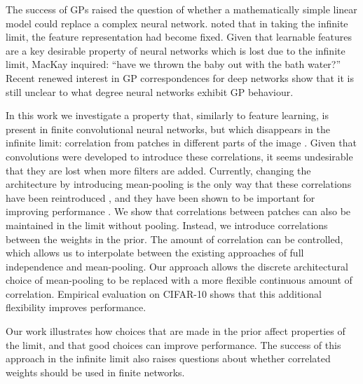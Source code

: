 \documentclass{article}
\theoremstyle{definition}
\begin{document}
The success of GPs raised the question of whether a mathematically simple linear model could replace a complex neural network. \citet{mackay1998introgp} noted that in taking the infinite limit, the feature representation had become fixed. Given that learnable features are a key desirable property of neural networks which is lost due to the infinite limit, MacKay inquired: ``have we thrown the baby out with the bath water?'' Recent renewed interest in GP correspondences for deep networks \citep{matthews2018dnnlimit,lee2018dnnlimit} show that it is still unclear to what degree neural networks exhibit GP behaviour.

In this work we investigate a property that, similarly to feature learning, is present in finite convolutional neural networks, but which disappears in the infinite limit: correlation from patches in different parts of the image \citep{garriga2018infiniteconv,novak2019infiniteconv}. Given that convolutions were developed to introduce these correlations, it seems undesirable that they are lost when more filters are added.
Currently, changing the architecture by introducing mean-pooling is the only way
that these correlations have been reintroduced \citep{novak2019infiniteconv},
and they have been shown to be important for improving performance
\citep{arora2019exact}. We show that correlations between patches can also be
maintained in the limit without pooling. Instead, we introduce correlations
between the weights in the prior. The amount of correlation can be controlled,
which allows us to interpolate between the existing approaches of full
independence and mean-pooling. Our approach allows the discrete architectural choice of mean-pooling to be replaced with a more flexible continuous amount of correlation. Empirical evaluation on CIFAR-10 shows that this additional flexibility improves performance.

Our work illustrates how choices that are made in the prior affect properties of the limit, and that good choices can improve performance. The success of this approach in the infinite limit also raises questions about whether correlated weights should be used in finite networks.
\end{document}
